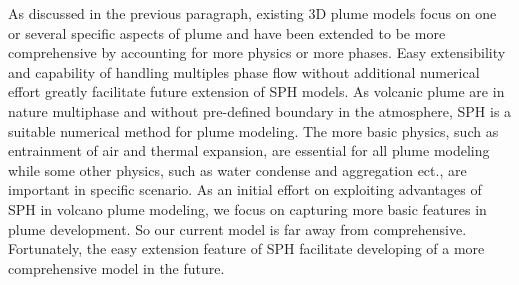 \documentclass[journal abbreviation, manuscript]{copernicus}
\begin{document}
As discussed in the previous paragraph, existing 3D plume models focus on one or several specific aspects of plume and have been extended to be more comprehensive by accounting for more physics or more phases. Easy extensibility and capability of handling multiples phase flow without additional numerical effort greatly facilitate future extension of SPH models. As volcanic plume are in nature multiphase and without pre-defined boundary in the atmosphere, SPH is a suitable numerical method for plume modeling. The more basic physics, such as entrainment of air and thermal expansion, are essential for all plume modeling while some other physics, such as water condense and aggregation ect., are important in specific scenario. As an initial effort on exploiting advantages of SPH in volcano plume modeling, we focus on capturing more basic features in plume development. So our current model is far away from comprehensive. Fortunately, the easy extension feature of SPH facilitate developing of a more comprehensive model in the future.\\
%
\end{document}
